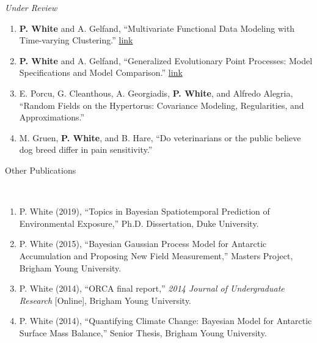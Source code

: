 \documentclass[12pt]{article}
\newcommand{\head}[1]{ %
    \bigskip %
    \begin{large}\begin{bf}{#1}\end{bf}\end{large} %

    \ \\ [-1.3cm] %

    \hrulefill}
\begin{document}
\emph{Under Review}

\begin{enumerate}[label=$\bullet$]
\item \textbf{P. White} and A. Gelfand, ``Multivariate Functional Data Modeling with Time-varying Clustering.'' \href{https://arxiv.org/abs/1904.11518}{link}
\item \textbf{P. White} and A. Gelfand, ``Generalized Evolutionary Point Processes: Model Specifications and Model Comparison.''  \href{https://arxiv.org/abs/1910.06897}{link}
\item E. Porcu, G. Cleanthous, A. Georgiadis, \textbf{P. White}, and  Alfredo Alegria, ``Random Fields on the Hypertorus: Covariance Modeling, Regularities, and Approximations.'' 
\item M. Gruen, \textbf{P. White}, and B. Hare, ``Do veterinarians or the public believe dog breed differ in pain sensitivity.''
\end{enumerate}


%


\head{Other Publications}

\begin{enumerate}[label=$\bullet$]
\item P. White (2019), ``Topics in Bayesian Spatiotemporal Prediction of Environmental Exposure,'' Ph.D. Dissertation, Duke University.
\item P. White (2015), ``Bayesian Gaussian Process Model for Antarctic Accumulation and Proposing New Field Measurement,'' Masters Project, Brigham Young University.
\item P. White (2014), ``ORCA final report,'' \emph{2014 Journal of Undergraduate Research} [Online], Brigham Young University.
\item P. White (2014), ``Quantifying Climate Change: Bayesian Model for Antarctic Surface Mass Balance,'' Senior Thesis, Brigham Young University.
\end{enumerate}
\end{document}
